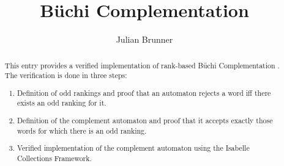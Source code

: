 \documentclass[11pt, a4paper]{article}
\begin{document}
\title{Büchi Complementation}
\author{Julian Brunner}

\maketitle

\begin{abstract}
	This entry provides a verified implementation of rank-based Büchi Complementation \cite{complementation}.
	The verification is done in three steps:
	\begin{enumerate}
		\item Definition of odd rankings and proof that an automaton rejects a word iff there exists an odd ranking for it.
		\item Definition of the complement automaton and proof that it accepts exactly those words for which there is an odd ranking.
		\item Verified implementation of the complement automaton using the Isabelle Collections Framework.
	\end{enumerate}
\end{abstract}

\tableofcontents





\end{document}
